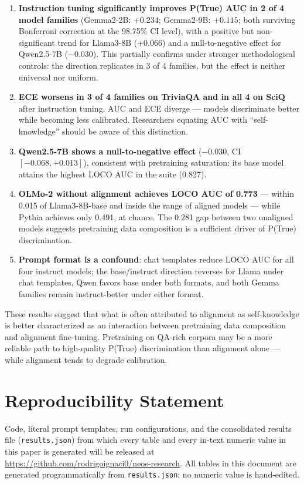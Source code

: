 \documentclass[11pt]{article}
\begin{document}
\begin{enumerate}
  \item \textbf{Instruction tuning significantly improves P(True) AUC in 2 of 4 model families} (Gemma2-2B: $+0.234$; Gemma2-9B: $+0.115$; both surviving Bonferroni correction at the 98.75\% CI level), with a positive but non-significant trend for Llama3-8B ($+0.066$) and a null-to-negative effect for Qwen2.5-7B ($-0.030$). This partially confirms \citet{kadavath2022} under stronger methodological controls: the direction replicates in 3 of 4 families, but the effect is neither universal nor uniform.
  \item \textbf{ECE worsens in 3 of 4 families on TriviaQA and in all 4 on SciQ} after instruction tuning. AUC and ECE diverge --- models discriminate better while becoming less calibrated. Researchers equating AUC with ``self-knowledge'' should be aware of this distinction.
  \item \textbf{Qwen2.5-7B shows a null-to-negative effect} ($-0.030$, CI $[-0.068, +0.013]$), consistent with pretraining saturation: its base model attains the highest LOCO AUC in the suite (0.827).
  \item \textbf{OLMo-2 without alignment achieves LOCO AUC of 0.773} --- within 0.015 of Llama3-8B-base and inside the range of aligned models --- while Pythia achieves only 0.491, at chance. The 0.281 gap between two unaligned models suggests pretraining data composition is a sufficient driver of P(True) discrimination.
  \item \textbf{Prompt format is a confound}: chat templates reduce LOCO AUC for all four instruct models; the base/instruct direction reverses for Llama under chat templates, Qwen favors base under both formats, and both Gemma families remain instruct-better under either format.
\end{enumerate}

These results suggest that what is often attributed to alignment as self-knowledge is better characterized as an interaction between pretraining data composition and alignment fine-tuning. Pretraining on QA-rich corpora may be a more reliable path to high-quality P(True) discrimination than alignment alone --- while alignment tends to degrade calibration.

\section*{Reproducibility Statement}

Code, literal prompt templates, run configurations, and the consolidated results file (\texttt{results.json}) from which every table and every in-text numeric value in this paper is generated will be released at \url{https://github.com/rodrigoignaci0/neos-research}. All tables in this document are generated programmatically from \texttt{results.json}; no numeric value is hand-edited.
\end{document}
